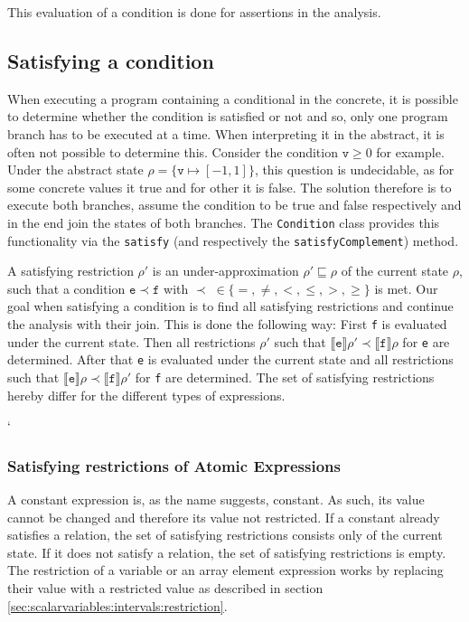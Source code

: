 \noindent This evaluation of a condition is done for assertions in the analysis. 

\subsection{Satisfying a condition}
When executing a program containing a conditional in the concrete, it is possible to determine whether the condition is satisfied or not and so, only one program branch has to be executed at a time. When interpreting it in the abstract, it is often not possible to determine this. Consider the condition $\mathtt{v}\geq0$ for example. Under the abstract state $\rho=\{\mathtt{v}\mapsto[-1,1]\}$, this question is undecidable, as for some concrete values it true and for other it is false. The solution therefore is to execute both branches, assume the condition to be true and false respectively and in the end join the states of both branches. The \texttt{Condition} class provides this functionality via the \texttt{satisfy} (and respectively the \texttt{satisfyComplement}) method. 


A satisfying restriction $\rho'$ is an under-approximation $\rho'\sqsubseteq\rho$ of the current state $\rho$, such that a condition $\mathtt{e}\prec\mathtt{f}$ with $\prec \;\in \{=,\neq,<,\leq,>,\geq\}$ is met. Our goal when satisfying a condition is to find all satisfying restrictions and continue the analysis with their join. This is done the following way: First \texttt{f} is evaluated under the current state. Then all restrictions $\rho'$ such that $\llbracket\mathtt{e}\rrbracket\rho'\prec\llbracket\mathtt{f}\rrbracket\rho$ for \texttt{e} are determined. After that \texttt{e} is evaluated under the current state and all restrictions such that $\llbracket\mathtt{e}\rrbracket\rho\prec\llbracket\mathtt{f}\rrbracket\rho'$ for \texttt{f} are determined. The set of satisfying restrictions hereby differ for the different types of expressions.

`
\subsubsection{Satisfying restrictions of Atomic Expressions}

A constant expression is, as the name suggests, constant. As such, its value cannot be changed and therefore its value not restricted. If a constant already satisfies a relation, the set of satisfying restrictions consists only of the current state. If it does not satisfy a relation, the set of satisfying restrictions is empty. The restriction of a variable or an array element expression works by replacing their value with a restricted value as described in section \ref{sec:scalarvariables:intervals:restriction}. 

